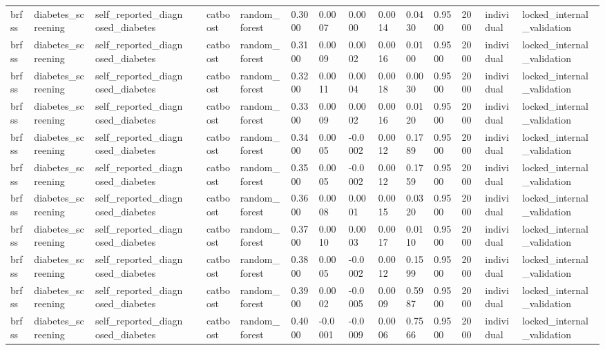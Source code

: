 \begin{tabular}{lllllllllllllll}
brfss & diabetes\_screening & self\_reported\_diagnosed\_diabetes &  & catboost & random\_forest & 0.3000 & 0.0007 & 0.0000 & 0.0014 & 0.0430 & 0.9500 & 2000 & individual & locked\_internal\_validation \\
brfss & diabetes\_screening & self\_reported\_diagnosed\_diabetes &  & catboost & random\_forest & 0.3100 & 0.0009 & 0.0002 & 0.0016 & 0.0100 & 0.9500 & 2000 & individual & locked\_internal\_validation \\
brfss & diabetes\_screening & self\_reported\_diagnosed\_diabetes &  & catboost & random\_forest & 0.3200 & 0.0011 & 0.0004 & 0.0018 & 0.0030 & 0.9500 & 2000 & individual & locked\_internal\_validation \\
brfss & diabetes\_screening & self\_reported\_diagnosed\_diabetes &  & catboost & random\_forest & 0.3300 & 0.0009 & 0.0002 & 0.0016 & 0.0120 & 0.9500 & 2000 & individual & locked\_internal\_validation \\
brfss & diabetes\_screening & self\_reported\_diagnosed\_diabetes &  & catboost & random\_forest & 0.3400 & 0.0005 & -0.0002 & 0.0012 & 0.1789 & 0.9500 & 2000 & individual & locked\_internal\_validation \\
brfss & diabetes\_screening & self\_reported\_diagnosed\_diabetes &  & catboost & random\_forest & 0.3500 & 0.0005 & -0.0002 & 0.0012 & 0.1759 & 0.9500 & 2000 & individual & locked\_internal\_validation \\
brfss & diabetes\_screening & self\_reported\_diagnosed\_diabetes &  & catboost & random\_forest & 0.3600 & 0.0008 & 0.0001 & 0.0015 & 0.0320 & 0.9500 & 2000 & individual & locked\_internal\_validation \\
brfss & diabetes\_screening & self\_reported\_diagnosed\_diabetes &  & catboost & random\_forest & 0.3700 & 0.0010 & 0.0003 & 0.0017 & 0.0110 & 0.9500 & 2000 & individual & locked\_internal\_validation \\
brfss & diabetes\_screening & self\_reported\_diagnosed\_diabetes &  & catboost & random\_forest & 0.3800 & 0.0005 & -0.0002 & 0.0012 & 0.1599 & 0.9500 & 2000 & individual & locked\_internal\_validation \\
brfss & diabetes\_screening & self\_reported\_diagnosed\_diabetes &  & catboost & random\_forest & 0.3900 & 0.0002 & -0.0005 & 0.0009 & 0.5987 & 0.9500 & 2000 & individual & locked\_internal\_validation \\
brfss & diabetes\_screening & self\_reported\_diagnosed\_diabetes &  & catboost & random\_forest & 0.4000 & -0.0001 & -0.0009 & 0.0006 & 0.7566 & 0.9500 & 2000 & individual & locked\_internal\_validation \\

\end{tabular}
